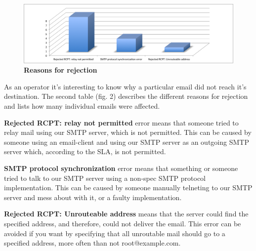 \begin{figure}[htb]
  \begin{center}
    \includegraphics[scale=0.55]{img/rejection-reasons.png}
  \end{center}
  \caption{\bf{Reasons for rejection}}
\end{figure}

As an operator it's interesting to know why a particular email did not reach
it's destination. The second table (fig. 2) describes the different reasons for
rejection and lists how many individual emails were affected.

\begin{description}
\item \textbf{Rejected RCPT: relay not permitted} error means that someone tried to relay mail
using our SMTP server, which is not permitted. This can be caused by someone
using an email-client and using our SMTP server as an outgoing SMTP server
which, according to the SLA, is not permitted.

\item \textbf{SMTP protocol synchronization} error means that something or someone tried to
talk to our SMTP server using a non-spec SMTP protocol implementation. This can
be caused by someone manually telneting to our SMTP server and mess about with
it, or a faulty implementation.

\item \textbf{Rejected RCPT: Unrouteable address} means that the server could find the
specified address, and therefore, could not deliver the email. This error can be
avoided if you want by specifying that all unroutable mail should go to a
specified address, more often than not root@example.com. 

\end{description}

